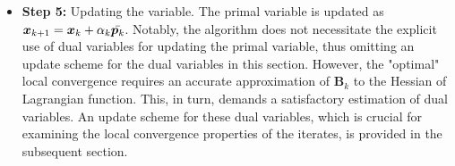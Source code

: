 \documentclass[aos]{imsart}
\numberwithin{equation}{section}
\theoremstyle{plain}
\begin{document}
\begin{itemize}
    \item \textbf{Step 5:} Updating the variable. The primal variable is updated as $\bm{x}_{k+1} = \bm{x}_k + \alpha_k \Bar{\bm{p}_k}$. 
    Notably, the algorithm does not necessitate the explicit use of dual variables for updating the primal variable, thus omitting an update scheme for the dual variables in this section.
    However, the "optimal" local convergence requires an accurate approximation of $\bm{B}_k$ to the Hessian of Lagrangian function. This, in turn, demands a satisfactory estimation of dual variables. 
    An update scheme for these dual variables, which is crucial for examining the local convergence properties of the iterates, is provided in the subsequent section.
\end{itemize}
\end{document}
